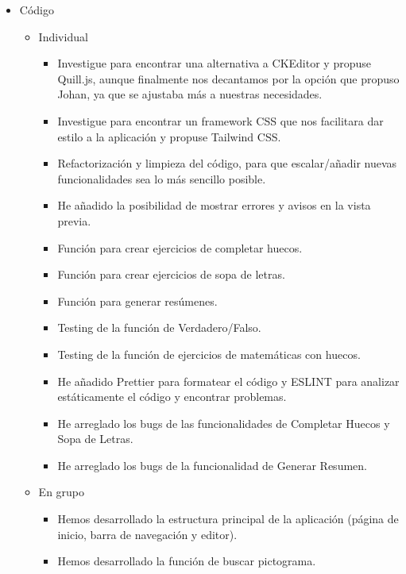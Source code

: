 \begin{itemize}
    \item Código
          \begin{itemize}
              \item Individual
                    \begin{itemize}
                        \item Investigue para encontrar una alternativa a CKEditor y propuse Quill.js, aunque finalmente nos decantamos por la opción que propuso Johan, ya que se ajustaba más a nuestras necesidades.
                        \item Investigue para encontrar un framework CSS que nos facilitara dar estilo a la aplicación y propuse Tailwind CSS.
                        \item Refactorización y limpieza del código, para que escalar/añadir nuevas funcionalidades sea lo más sencillo posible.
                        \item He añadido la posibilidad de mostrar errores y avisos en la vista previa.
                        \item Función para crear ejercicios de completar huecos.
                        \item Función para crear ejercicios de sopa de letras.
                        \item Función para generar resúmenes.
                        \item Testing de la función de Verdadero/Falso.
                        \item Testing de la función de ejercicios de matemáticas con huecos.
                        \item He añadido Prettier para formatear el código y ESLINT para analizar estáticamente el código y encontrar problemas.
                        \item He arreglado los bugs de las funcionalidades de Completar Huecos y Sopa de Letras.
                        \item He arreglado los bugs de la funcionalidad de Generar Resumen.
                    \end{itemize}
              \item En grupo
                    \begin{itemize}
                        \item Hemos desarrollado la estructura principal de la aplicación (página de inicio, barra de navegación y editor).
                        \item Hemos desarrollado la función de buscar pictograma.

\end{itemize}
\end{itemize}
\end{itemize}
